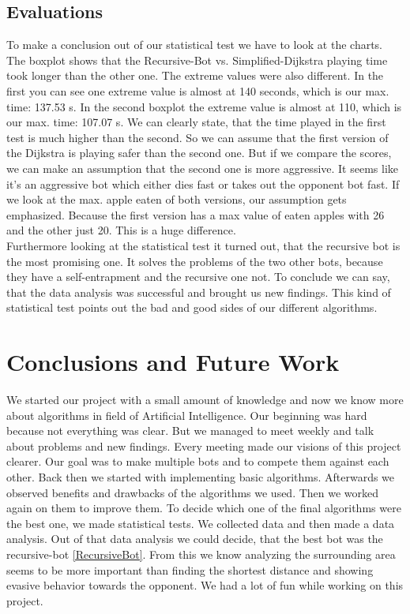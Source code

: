 \documentclass[a4paper,12pt]{article}
\begin{document}
\subsection{Evaluations}
To make a conclusion out of our statistical test we have to look at the charts. The boxplot shows that the Recursive-Bot vs. Simplified-Dijkstra playing time took longer than the other one. The extreme values were also different. In the first you can see one extreme value is almost at 140 seconds, which is our max. time: 137.53 s. In the second boxplot the extreme value is almost at 110, which is our max. time: 107.07 s. We can clearly state, that the time played in the first test is much higher than the second. So we can assume that the first version of the Dijkstra is playing safer than the second one. But if we compare the scores, we can make an assumption that the second one is more aggressive. It seems like it's an aggressive bot which either dies fast or takes out the opponent bot fast. If we look at the max. apple eaten of both versions, our assumption gets emphasized. Because the first version has a max value of eaten apples with 26 and the other just 20. This is a huge difference.\\
Furthermore looking at the statistical test it turned out, that the recursive bot is the most promising one. It solves the problems of the two other bots, because they have a self-entrapment and the recursive one not.
To conclude we can say, that the data analysis was successful and brought us new findings. This kind of statistical test points out the bad and good sides of our different algorithms. 

\section{Conclusions and Future Work}
We started our project with a small amount of knowledge and now we know more about algorithms in field of Artificial Intelligence. Our beginning was hard because not everything was clear. But we managed to meet weekly and talk about problems and new findings. Every meeting made our visions of this project clearer. Our goal was to make multiple bots and to compete them against each other. Back then we started with implementing basic algorithms. Afterwards we observed benefits and drawbacks of the algorithms we used. Then we worked again on them to improve them. To decide which one of the final algorithms were the best one, we made statistical tests. We collected data and then made a data analysis. Out of that data analysis we could decide, that the best bot was the recursive-bot \ref{RecursiveBot}. From this we know analyzing the surrounding area seems to be more important than finding the shortest
distance and showing evasive behavior towards the opponent. We had a lot of fun while working on this project.
\end{document}
